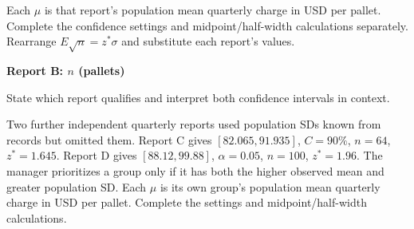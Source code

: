 Each $\mu$ is that report's population mean quarterly charge in USD per pallet. Complete the confidence settings and midpoint/half-width calculations separately.
Rearrange $E\sqrt n=z^*\sigma$ and substitute each report's values.
{\textbf{Report B: $n$ (pallets)}\par\guidedresponsebox[30mm]{\dimexpr\linewidth-1pt\relax}}
State which report qualifies and interpret both confidence intervals in context.\par\nopagebreak[4]
\guidedresponsebox[40mm]{\dimexpr\linewidth-1pt\relax}
\clearpage
{}
Two further independent quarterly reports used population SDs known from records but omitted them. Report C gives $[82.065,91.935]$, $C=90\%$, $n=64$, $z^*=1.645$. Report D gives $[88.12,99.88]$, $\alpha=0.05$, $n=100$, $z^*=1.96$. The manager prioritizes a group only if it has both the higher observed mean and greater population SD.
Each $\mu$ is its own group's population mean quarterly charge in USD per pallet. Complete the settings and midpoint/half-width calculations.
